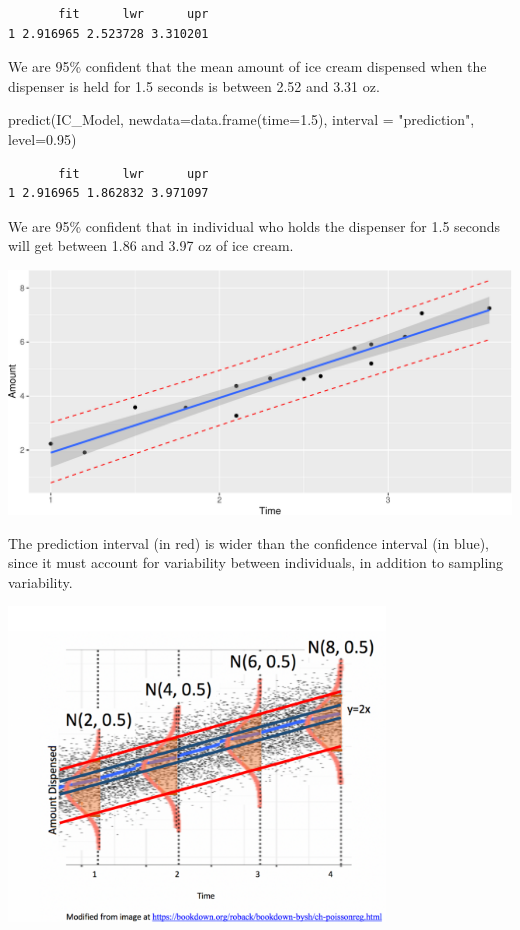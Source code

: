 \documentclass[
  letterpaper,
  DIV=11,
  numbers=noendperiod]{scrreprt}
\newenvironment{Shaded}{\begin{snugshade}}{\end{snugshade}}
\newcommand{\AttributeTok}[1]{\textcolor[rgb]{0.40,0.45,0.13}{#1}}
\newcommand{\FloatTok}[1]{\textcolor[rgb]{0.68,0.00,0.00}{#1}}
\newcommand{\FunctionTok}[1]{\textcolor[rgb]{0.28,0.35,0.67}{#1}}
\newcommand{\NormalTok}[1]{\textcolor[rgb]{0.00,0.23,0.31}{#1}}
\newcommand{\StringTok}[1]{\textcolor[rgb]{0.13,0.47,0.30}{#1}}
\begin{document}
\begin{verbatim}
       fit      lwr      upr
1 2.916965 2.523728 3.310201
\end{verbatim}

We are 95\% confident that the mean amount of ice cream dispensed when
the dispenser is held for 1.5 seconds is between 2.52 and 3.31 oz.

\begin{Shaded}
\begin{Highlighting}[]
\FunctionTok{predict}\NormalTok{(IC\_Model, }\AttributeTok{newdata=}\FunctionTok{data.frame}\NormalTok{(}\AttributeTok{time=}\FloatTok{1.5}\NormalTok{), }\AttributeTok{interval =} \StringTok{"prediction"}\NormalTok{, }\AttributeTok{level=}\FloatTok{0.95}\NormalTok{)}
\end{Highlighting}
\end{Shaded}

\begin{verbatim}
       fit      lwr      upr
1 2.916965 1.862832 3.971097
\end{verbatim}

We are 95\% confident that in individual who holds the dispenser for 1.5
seconds will get between 1.86 and 3.97 oz of ice cream.

\includegraphics{Ch4_files/figure-pdf/unnamed-chunk-78-1.pdf}

The prediction interval (in red) is wider than the confidence interval
(in blue), since it must account for variability between individuals, in
addition to sampling variability.

\includegraphics[width=0.75\textwidth,height=\textheight]{C_P_Band.png}
\end{document}
